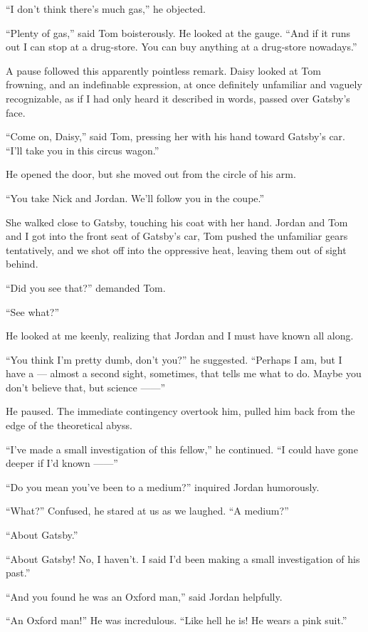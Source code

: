 \documentclass{znotebook}
\begin{document}
``I don’t think there’s much gas,'' he objected.

``Plenty of gas,'' said Tom boisterously. He looked at the gauge. ``And if it runs out I can stop at a drug-store. You can buy anything at a drug-store nowadays.''

A pause followed this apparently pointless remark. Daisy looked at Tom frowning, and an indefinable expression, at once definitely unfamiliar and vaguely recognizable, as if I had only heard it described in words, passed over Gatsby’s face.

``Come on, Daisy,'' said Tom, pressing her with his hand toward Gatsby’s car. ``I’ll take you in this circus wagon.''

He opened the door, but she moved out from the circle of his arm.

``You take Nick and Jordan. We’ll follow you in the coupe.''

She walked close to Gatsby, touching his coat with her hand. Jordan and Tom and I got into the front seat of Gatsby’s car, Tom pushed the unfamiliar gears tentatively, and we shot off into the oppressive heat, leaving them out of sight behind.

``Did you see that?'' demanded Tom.

``See what?''

He looked at me keenly, realizing that Jordan and I must have known all along.

``You think I’m pretty dumb, don’t you?'' he suggested. ``Perhaps I am, but I have a — almost a second sight, sometimes, that tells me what to do. Maybe you don’t believe that, but science ——''

He paused. The immediate contingency overtook him, pulled him back from the edge of the theoretical abyss.

``I’ve made a small investigation of this fellow,'' he continued. ``I could have gone deeper if I’d known ——''

``Do you mean you’ve been to a medium?'' inquired Jordan humorously.

``What?'' Confused, he stared at us as we laughed. ``A medium?''

``About Gatsby.''

``About Gatsby! No, I haven’t. I said I’d been making a small investigation of his past.''

``And you found he was an Oxford man,'' said Jordan helpfully.

``An Oxford man!'' He was incredulous. ``Like hell he is! He wears a pink suit.''
\end{document}
